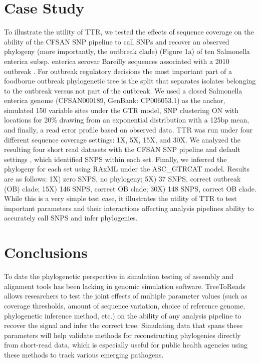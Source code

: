 \section{Case Study}
To illustrate the utility of TTR, we tested the effects of sequence coverage on the ability of the CFSAN SNP pipeline \citep{davis_cfsan_2015} 
to call SNPs and recover an observed phylogeny (more importantly, the outbreak clade) (Figure 1a) of ten Salmonella enterica subsp. enterica serovar Bareilly sequences 
associated with a 2010 outbreak \citep{hoffmann_tracing_2015}. 
For outbreak regulatory decisions the most important part of a foodborne outbreak phylogenetic tree is the split that separates isolates belonging to the outbreak versus not part of the outbreak. 
We used a closed Salmonella enterica genome (CFSAN000189, GenBank: CP006053.1) as the anchor, simulated 150 variable sites under the GTR model, 
SNP clustering ON with locations for 20\% drawing from an exponential distribution with a 125bp mean, and finally, a read error profile based on observed data. 
TTR was run under four different sequence coverage settings: 1X, 5X, 15X, and 30X. 
We analyzed the resulting four short read datasets with the CFSAN SNP pipeline and default settings \citep{davis_cfsan_2015}, 
which identified SNPS within each set. 
Finally, we inferred the phylogeny for each set using RAxML \citep{stamatakis_raxml_2014} under the ASC\_GTRCAT model.  
Results are as follows: 1X) zero SNPS, no phylogeny; 5X) 37 SNPS, correct outbreak (OB) clade; 15X) 146 SNPS, correct OB clade; 30X) 148 SNPS, correct OB clade.  
While this is a very simple test case, it illustrates the utility of TTR to test important parameters and their interactions affecting analysis pipelines ability to accurately call SNPS and infer phylogenies.

\section{Conclusions}
To date the phylogenetic perspective in simulation testing of assembly and alignment tools has been lacking in genomic simulation software. 
TreeToReads allows researchers to test the joint effects of multiple parameter values (such as coverage thresholds, 
amount of sequence variation, choice of reference genome, phylogenetic inference method, etc.) on the ability of any analysis pipeline to recover the signal and infer the correct tree. 
Simulating data that spans these parameters will help validate methods for reconstructing phylogenies directly from short-read data, 
which is especially useful for public health agencies using these methods to track various emerging pathogens. 





